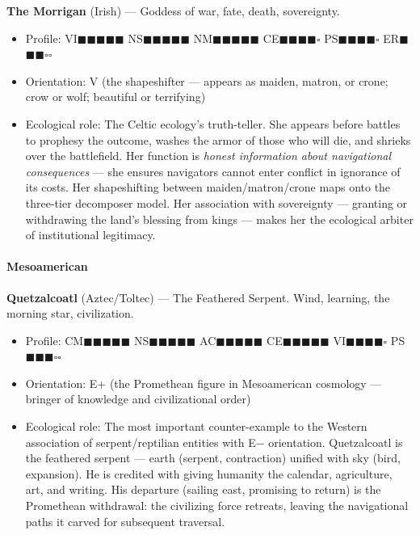 \textbf{The Morrigan} (Irish) — Goddess of war, fate, death, sovereignty.

\begin{itemize}[nosep,leftmargin=*]
  \item Profile: VI$\blacksquare$$\blacksquare$$\blacksquare$$\blacksquare$$\blacksquare$ NS$\blacksquare$$\blacksquare$$\blacksquare$$\blacksquare$$\blacksquare$ NM$\blacksquare$$\blacksquare$$\blacksquare$$\blacksquare$$\blacksquare$ CE$\blacksquare$$\blacksquare$$\blacksquare$$\blacksquare$$\square$ PS$\blacksquare$$\blacksquare$$\blacksquare$$\blacksquare$$\square$ ER$\blacksquare$$\blacksquare$$\blacksquare$$\square$$\square$
  \item Orientation: V (the shapeshifter — appears as maiden, matron, or crone; crow or wolf; beautiful or terrifying)
  \item Ecological role: The Celtic ecology's truth-teller. She appears before battles to prophesy the outcome, washes the armor of those who will die, and shrieks over the battlefield. Her function is \textit{honest information about navigational consequences} — she ensures navigators cannot enter conflict in ignorance of its costs. Her shapeshifting between maiden/matron/crone maps onto the three-tier decomposer model. Her association with sovereignty — granting or withdrawing the land's blessing from kings — makes her the ecological arbiter of institutional legitimacy.
\end{itemize}


\paragraph*{Mesoamerican}


\textbf{Quetzalcoatl} (Aztec/Toltec) — The Feathered Serpent. Wind, learning, the morning star, civilization.

\begin{itemize}[nosep,leftmargin=*]
  \item Profile: CM$\blacksquare$$\blacksquare$$\blacksquare$$\blacksquare$$\blacksquare$ NS$\blacksquare$$\blacksquare$$\blacksquare$$\blacksquare$$\blacksquare$ AC$\blacksquare$$\blacksquare$$\blacksquare$$\blacksquare$$\blacksquare$ CE$\blacksquare$$\blacksquare$$\blacksquare$$\blacksquare$$\blacksquare$ VI$\blacksquare$$\blacksquare$$\blacksquare$$\blacksquare$$\square$ PS$\blacksquare$$\blacksquare$$\blacksquare$$\square$$\square$
  \item Orientation: E+ (the Promethean figure in Mesoamerican cosmology — bringer of knowledge and civilizational order)
  \item Ecological role: The most important counter-example to the Western association of serpent/reptilian entities with E− orientation. Quetzalcoatl is the feathered serpent — earth (serpent, contraction) unified with sky (bird, expansion). He is credited with giving humanity the calendar, agriculture, art, and writing. His departure (sailing east, promising to return) is the Promethean withdrawal: the civilizing force retreats, leaving the navigational paths it carved for subsequent traversal.
\end{itemize}


